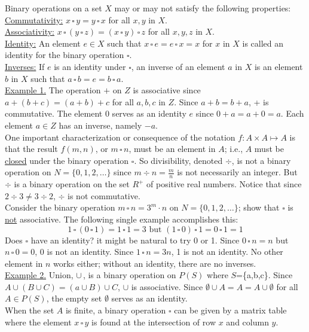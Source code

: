 \documentclass[12pt]{book}
\theoremstyle{definition}
\begin{document}
Binary operations on a set $X$ may or may not satisfy the following properties:\\
\underline{Commutativity:} $x\,\square\, y =y\,\square\, x$ for all $x,y$ in $X$.\\
\underline{Associativity:} $x\,\square\,(y\,\square\, z)=(x\,\square\, y)\,\square\, z$ for all $x,y,z$ in $X$.\\
\underline{Identity:} An element $e\in X$ such that $x\,\square\, e=e\,\square\, x = x$ for $x$ in $X$ is called an identity for the binary operation $\square$.\\
\underline{Inverses:} If $e$ is an identity under $\square$, an inverse of an element $a$ in $X$ is an element $b$ in $X$ such that $a\,\square\, b=e=b\,\square\, a$.\\
\underline{Example 1.}  The operation $+$ on $Z$ is associative since $a+(b+c)=(a+b)+c$ for all $a,b,c$ in $Z$.  Since $a+b=b+a$, + is commutative.  The element 0 serves as an identity $e$ since $0+a=a+0=a$.  Each element $a\in Z$ has an inverse, namely $-a$.\\[.1in]

One important characterization or consequence of the notation $f:A\times A\mapsto A$ is that the result $f(m,n)$, or $m\,\square\, n$, must be an element in $A$; i.e., $A$ must be \underline {closed} under the binary operation $\square$.  So divisibility, denoted $\div$, is not a binary operation on $N=\{0,1,2,\dots\}$ since $m\div n = \frac m n$ is not necessarily an integer.  But $\div$ is a binary operation on the set $R^+$ of positive real numbers.  Notice that since $2\div3\neq3\div2$, $\div$ is not commutative.\\[.5in]

Consider the binary operation $m\,\square\, n=3^m\cdot n$ on $N=\{0,1,2,\dots\}$; show that $\square$ is \underline{not} associative.  The following single example accomplishes this:
$$1\,\square\,(0\,\square\, 1) = 1\,\square\, 1 = 3\text{ but }(1\,\square\, 0)\,\square\, 1 = 0\,\square\, 1 = 1$$
Does $\square$ have an identity?  it might be natural to try 0 or 1.  Since $0\,\square\, n = n$ but $n\,\square\, 0=0$, 0 is not an identity.  Since $1\,\square\, n = 3n$, 1 is not an identity.  No other element in $n$ works either;  without an identity, there are no inverses.\\[.5in]
\underline{Example 2.}  Union, $\cup\,$, is a binary operation on $P(S)$ where $S$=\{a,b,c\}.  Since $A\cup(B\cup C)=(a\cup B)\cup C$, $\cup$ is associative.   Since $\emptyset \cup A=A=A\cup\emptyset$ for all $A\in P(S)$, the empty set $\emptyset$ serves as an identity.\\[.25in]
When the set $A$ is finite, a binary operation $\square$ can be given by a matrix table where the element $x\,\square\, y$ is found at the intersection of row $x$ and column $y$.
\end{document}
